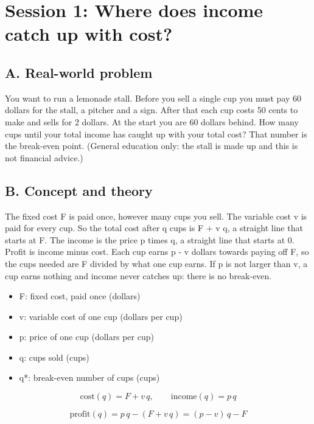 \documentclass[11pt,a4paper]{article}
\begin{document}
\section{Session 1: Where does income catch up with cost?}

\subsection*{A. Real-world problem}
You want to run a lemonade stall. Before you sell a single cup you must pay 60 dollars for the stall, a pitcher and a sign. After that each cup costs 50 cents to make and sells for 2 dollars. At the start you are 60 dollars behind. How many cups until your total income has caught up with your total cost? That number is the break-even point. (General education only: the stall is made up and this is not financial advice.)

\subsection*{B. Concept and theory}
The fixed cost F is paid once, however many cups you sell. The variable cost v is paid for every cup. So the total cost after q cups is F + v q, a straight line that starts at F. The income is the price p times q, a straight line that starts at 0. Profit is income minus cost. Each cup earns p - v dollars towards paying off F, so the cups needed are F divided by what one cup earns. If p is not larger than v, a cup earns nothing and income never catches up: there is no break-even.

\begin{itemize}[nosep]
\item F: fixed cost, paid once (dollars)
\item v: variable cost of one cup (dollars per cup)
\item p: price of one cup (dollars per cup)
\item q: cups sold (cups)
\item q*: break-even number of cups (cups)
\end{itemize}

\begin{equation*}
\text{cost}(q)=F+v\,q,\qquad \text{income}(q)=p\,q
\end{equation*}

\begin{equation*}
\text{profit}(q)=p\,q-(F+v\,q)=(p-v)\,q-F
\end{equation*}
\end{document}
